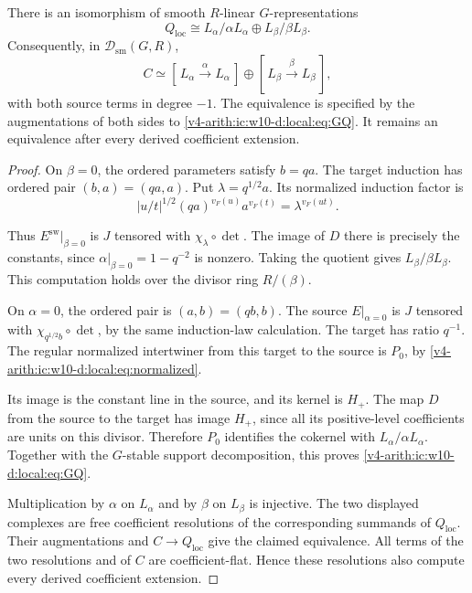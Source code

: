 \begin{theorem}\label{v4-arith:ic:w10-d:local:thm:representation}
There is an isomorphism of smooth $R$-linear $G$-representations
\begin{equation}\label{v4-arith:ic:w10-d:local:eq:GQ}
 Q_{\mathrm{loc}}\cong L_\alpha/\alpha L_\alpha
       \oplus L_\beta/\beta L_\beta.
\end{equation}
Consequently, in $\mathcal D_{\mathrm{sm}}(G,R)$,
\begin{equation}\label{v4-arith:ic:w10-d:local:eq:koszul}
 C\simeq
 [\,L_\alpha\xrightarrow{\alpha}L_\alpha\,]
 \oplus
 [\,L_\beta\xrightarrow{\beta}L_\beta\,],
\end{equation}
with both source terms in degree $-1$.
The equivalence is specified by the augmentations of both sides to \eqref{v4-arith:ic:w10-d:local:eq:GQ}.
It remains an equivalence after every derived coefficient extension.
\end{theorem}
\begin{proof}
On $\beta=0$, the ordered parameters satisfy $b=qa$.
The target induction has ordered pair $(b,a)=(qa,a)$.
Put $\lambda=q^{1/2}a$.
Its normalized induction factor is
\[
 |u/t|^{1/2}(qa)^{v_F(u)}a^{v_F(t)}
   =\lambda^{v_F(ut)}.
\]

Thus $E^\mathrm{sw}|_{\beta=0}$ is $J$ tensored with $\chi_\lambda\circ\det$.
The image of $D$ there is precisely the constants, since
$\alpha|_{\beta=0}=1-q^{-2}$ is nonzero.
Taking the quotient gives $L_\beta/\beta L_\beta$.
This computation holds over the divisor ring $R/(\beta)$.

On $\alpha=0$, the ordered pair is $(a,b)=(qb,b)$.
The source $E|_{\alpha=0}$ is $J$ tensored with
$\chi_{q^{1/2}b}\circ\det$, by the same induction-law calculation.
The target has ratio $q^{-1}$.
The regular normalized intertwiner from this target to the source is $P_0$,
by \eqref{v4-arith:ic:w10-d:local:eq:normalized}.

Its image is the constant line in the source, and its kernel is $H_+$.
The map $D$ from the source to the target has image $H_+$,
since all its positive-level coefficients are units on this divisor.
Therefore $P_0$ identifies the cokernel with $L_\alpha/\alpha L_\alpha$.
Together with the $G$-stable support decomposition, this proves \eqref{v4-arith:ic:w10-d:local:eq:GQ}.

Multiplication by $\alpha$ on $L_\alpha$ and by $\beta$ on $L_\beta$ is injective.
The two displayed complexes are free coefficient resolutions of the corresponding summands of $Q_{\mathrm{loc}}$.
Their augmentations and $C\to Q_{\mathrm{loc}}$ give the claimed equivalence.
All terms of the two resolutions and of $C$ are coefficient-flat.
Hence these resolutions also compute every derived coefficient extension.
\end{proof}


